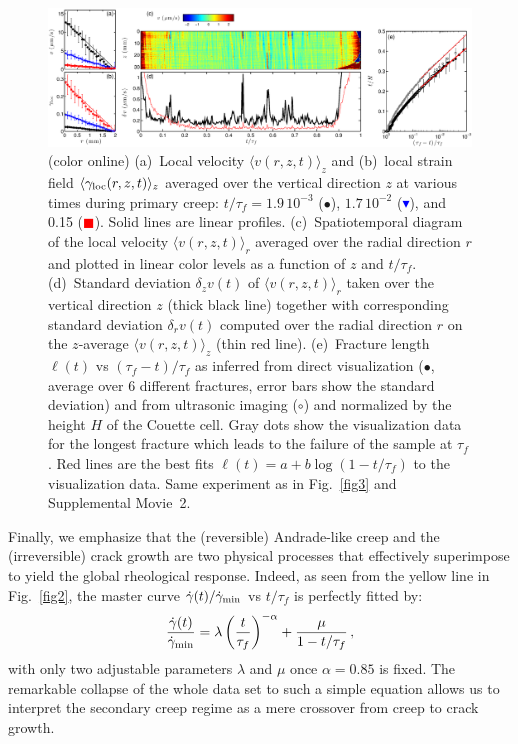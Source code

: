 \documentclass[twocolumn,superscriptaddress,showpacs,preprintnumbers,amsmath,amssymb,prl]{revtex4}
\newcommand\gp{\dot\gamma}
\newcommand\gl{\gamma_{\rm loc}}
\begin{document}
\begin{figure}
\centering
\includegraphics[width=17.5cm,clip]{Fig4.eps}
\caption{(color online) (a)~Local velocity $\langle v(r,z,t)\rangle_z$ and (b)~local strain field $\langle\gl(r,z,t)\rangle_z$ averaged over the vertical direction $z$ at various times during primary creep: $t/\tau_f=1.9\,10^{-3}$ ($\bullet$), $1.7\,10^{-2}$ (\textcolor{blue}{$\blacktriangledown$}), and 0.15 (\textcolor{red}{$\blacksquare$}). Solid lines are linear profiles. (c)~Spatiotemporal diagram of the local velocity $\langle v(r,z,t)\rangle_r$ averaged over the radial direction $r$ and plotted in linear color levels as a function of $z$ and $t/\tau_f$. (d)~Standard deviation $\delta_z v(t)$ of $\langle v(r,z,t)\rangle_r$ taken over the vertical direction $z$ (thick black line) together with corresponding standard deviation $\delta_r v(t)$ computed over the radial direction $r$ on the $z$-average $\langle v(r,z,t)\rangle_z$ (thin red line). (e)~Fracture length $\ell(t)$ vs $(\tau_f-t)/\tau_f$ as inferred from direct visualization ($\bullet$, average over 6 different fractures, error bars show the standard deviation) and from ultrasonic imaging ($\circ$) and normalized by the height $H$ of the Couette cell. Gray dots show the visualization data for the longest fracture which leads to the failure of the sample at $\tau_f$. Red lines are the best fits $\ell(t)=a+b\log(1-t/\tau_f)$ to the visualization data. Same experiment as in Fig.~\ref{fig3} and Supplemental Movie~2.
\label{fig4}}
\end{figure} 

Finally, we emphasize that the (reversible) Andrade-like creep and the (irreversible) crack growth are two  physical processes that effectively superimpose to yield the global rheological response. Indeed, as seen from the yellow line in Fig.~\ref{fig2}, the master curve $\gp(t)/\gp_{\rm min}$ vs $t/\tau_f$ is perfectly fitted by:
\begin{equation}
\frac{\gp(t)}{\gp_{\rm min}}=\lambda \left(\frac{t}{\tau_f}\right)^{-\alpha}+ \frac{\mu}{1-t/\tau_f}\,,
\label{e.fit}
\end{equation}
with only two adjustable parameters $\lambda$ and $\mu$ once $\alpha=0.85$ is fixed. The remarkable collapse of the whole data set to such a simple equation allows us to interpret the secondary creep regime as a mere crossover from creep to crack growth.
\end{document}
